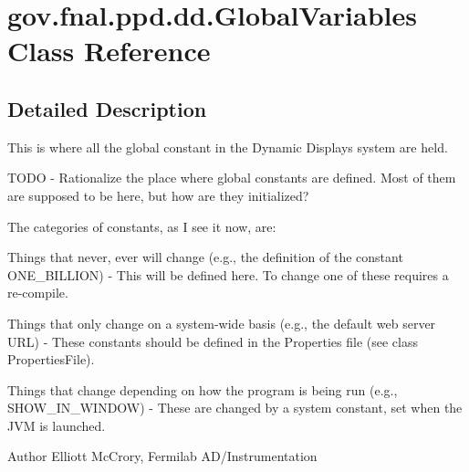 \hypertarget{classgov_1_1fnal_1_1ppd_1_1dd_1_1GlobalVariables}{\section{gov.\-fnal.\-ppd.\-dd.\-Global\-Variables Class Reference}
\label{classgov_1_1fnal_1_1ppd_1_1dd_1_1GlobalVariables}
}


\subsection{Detailed Description}
This is where all the global constant in the Dynamic Displays system are held.

T\-O\-D\-O -\/ Rationalize the place where global constants are defined. Most of them are supposed to be here, but how are they initialized?

The categories of constants, as I see it now, are\-:


\begin{DoxyEnumerate}
\item Things that never, ever will change (e.\-g., the definition of the constant O\-N\-E\-\_\-\-B\-I\-L\-L\-I\-O\-N) -\/ This will be defined here. To change one of these requires a re-\/compile.
\item Things that only change on a system-\/wide basis (e.\-g., the default web server U\-R\-L) -\/ These constants should be defined in the Properties file (see class Properties\-File).
\item Things that change depending on how the program is being run (e.\-g., S\-H\-O\-W\-\_\-\-I\-N\-\_\-\-W\-I\-N\-D\-O\-W) -\/ These are changed by a system constant, set when the J\-V\-M is launched.
\end{DoxyEnumerate}

\begin{DoxyAuthor}{Author}
Elliott Mc\-Crory, Fermilab A\-D/\-Instrumentation 
\end{DoxyAuthor}
